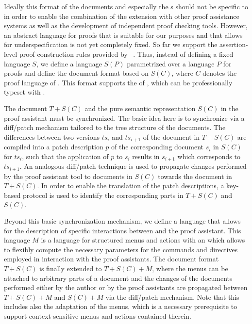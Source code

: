 \begin{omgroup}[id=texmacs-omega,short=Proof Assistants in Scientific Editors,
  creators={autexier,benzmueller,fiedler,lesourd}]
Ideally this format of the documents and especially the {s}
should not be specific to {\OMEGA} in order to enable the combination of the {\texmacs}
extension with other proof assistance systems as well as the development of independent
proof checking tools. However, an abstract language for proofs that is suitable for our
purposes and that allows for underspecification is not yet completely fixed. So far we
support the assertion-level proof construction rules provided by
{\CORE}~\cite{Aut03,Aut-05-a}. Thus, instead of defining a fixed language $S$, we define a
language $S(P)$ parametrized over a language $P$ for proofs and define the document
format based on $S(C)$, where $C$ denotes the proof language of {\CORE}. This format
supports the {\emph{}} of
{}, which can be professionally typeset with
{\texmacs}.

The {\texmacs} document $T+S(C)$ and the pure semantic representation $S(C)$ in the proof
assistant must be synchronized. The basic idea here is to synchronize via a diff/patch
mechanism tailored to the tree structure of the {\texmacs} documents. The differences
between two versions $ts_i$ and $ts_{i+1}$ of the document in $T+S(C)$ are compiled into a
patch description $p$ of the corresponding document $s_i$ in $S(C)$ for $ts_i$, such that
the application of $p$ to $s_i$ results in $s_{i+1}$ which corresponds to $ts_{i+1}$. An
analogous diff/patch technique is used to propagate changes performed by the proof
assistant tool to documents in $S(C)$ towards the {\texmacs} document in $T+S(C)$. In
order to enable the translation of the patch descriptions, a key-based protocol is used to
identify the corresponding parts in $T+S(C)$ and $S(C)$.

Beyond this basic synchronization mechanism, we define a language that allows for the
description of specific interactions between {\texmacs} and the proof assistant.  This
language $M$ is a language for structured menus and actions with an
{} which allows to flexibly compute the necessary
parameters for the commands and directives employed in interaction with the proof
assistants. The {\texmacs} document format $T+S(C)$ is finally extended to $T+S(C)+M$,
where the menus can be attached to arbitrary parts of a document and the changes of the
documents performed either by the author or by the proof assistants are propagated between
$T+S(C)+M$ and $S(C)+M$ via the diff/patch mechanism. Note that this includes also the
adaptation of the menus, which is a necessary prerequisite to support context-sensitive
menus and actions contained therein.


\end{omgroup}

